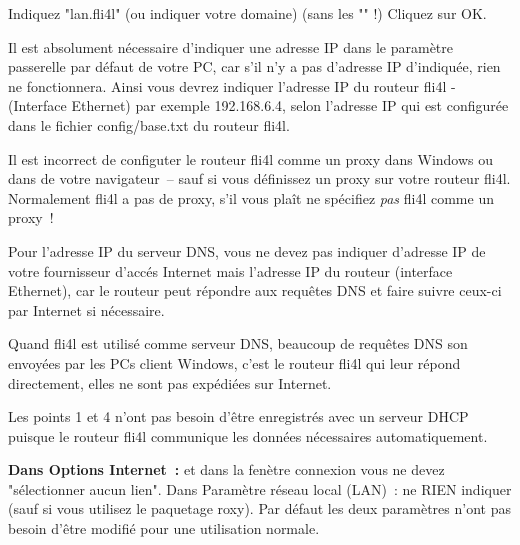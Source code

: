   Indiquez "lan.fli4l" (ou indiquer votre domaine) (sans les "" !)
  \pfeil Cliquez sur OK.


  Il est absolument nécessaire d'indiquer une adresse IP dans le paramètre
  passerelle par défaut de votre PC, car s'il n'y a pas d'adresse IP d'indiquée,
  rien ne fonctionnera. Ainsi vous devrez indiquer l'adresse IP du routeur
  fli4l - (Interface Ethernet) par exemple 192.168.6.4, selon l'adresse
  IP qui est configurée dans le fichier config/base.txt du routeur fli4l.

  Il est incorrect de configuter le routeur fli4l comme un proxy dans Windows
  ou dans de votre navigateur~-- sauf si vous définissez un proxy sur votre
  routeur fli4l. Normalement fli4l a pas de proxy, s'il vous plaît ne spécifiez
  \emph{pas} fli4l comme un proxy~!


  Pour l'adresse IP du serveur DNS, vous ne devez pas indiquer
  d'adresse IP de votre fournisseur d'accés Internet mais l'adresse IP
  du routeur (interface Ethernet), car le routeur peut répondre aux
  requêtes DNS et faire suivre ceux-ci par Internet si nécessaire.

  Quand fli4l est utilisé comme serveur DNS, beaucoup de requêtes
  DNS son envoyées par les PCs client Windows, c'est le routeur fli4l qui
  leur répond directement, elles ne sont pas expédiées sur Internet.


  Les points 1 et 4 n'ont pas besoin d'être enregistrés avec un
  serveur DHCP puisque le routeur fli4l communique les données
  nécessaires automatiquement.

  \textbf{Dans Options Internet~:} et dans la fenètre connexion vous ne devez
  "sélectionner aucun lien". Dans Paramètre réseau local (LAN)~: ne RIEN
  indiquer (sauf si vous utilisez le paquetage roxy).
  Par défaut les deux paramètres n'ont pas besoin d'être modifié pour
  une utilisation normale.


